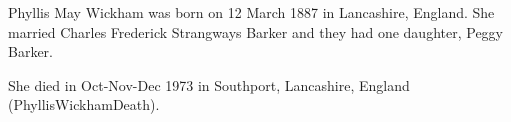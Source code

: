 
Phyllis May Wickham was born on 12 March 1887 in Lancashire, England.  She married Charles Frederick Strangways Barker and they had one daughter, Peggy Barker.  

She died in Oct-Nov-Dec 1973 in Southport, Lancashire, England (PhyllisWickhamDeath).

